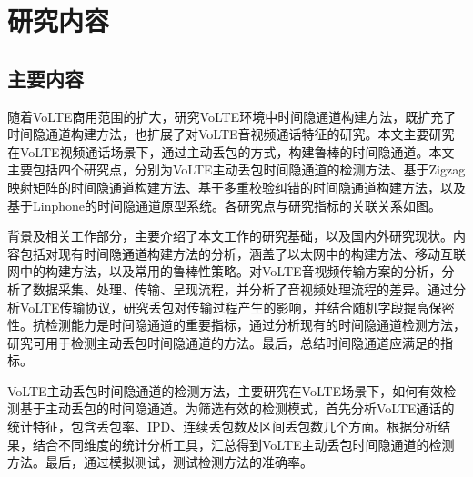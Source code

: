 \section{研究内容}
\label{sec:intro:work}

\subsection{主要内容}
\label{sec:intro:work:mainwork}

随着VoLTE商用范围的扩大，研究VoLTE环境中时间隐通道构建方法，既扩充了时间隐通道构建方法，也扩展了对VoLTE音视频通话特征的研究。本文主要研究在VoLTE视频通话场景下，通过主动丢包的方式，构建鲁棒的时间隐通道。本文主要包括四个研究点，分别为VoLTE主动丢包时间隐通道的检测方法、基于Zigzag映射矩阵的时间隐通道构建方法、基于多重校验纠错的时间隐通道构建方法，以及基于Linphone的时间隐通道原型系统。各研究点与研究指标的关联关系如图。


背景及相关工作部分，主要介绍了本文工作的研究基础，以及国内外研究现状。内容包括对现有时间隐通道构建方法的分析，涵盖了以太网中的构建方法、移动互联网中的构建方法，以及常用的鲁棒性策略。对VoLTE音视频传输方案的分析，分析了数据采集、处理、传输、呈现流程，并分析了音视频处理流程的差异。通过分析VoLTE传输协议，研究丢包对传输过程产生的影响，并结合随机字段提高保密性。抗检测能力是时间隐通道的重要指标，通过分析现有的时间隐通道检测方法，研究可用于检测主动丢包时间隐通道的方法。最后，总结时间隐通道应满足的指标。

VoLTE主动丢包时间隐通道的检测方法，主要研究在VoLTE场景下，如何有效检测基于主动丢包的时间隐通道。为筛选有效的检测模式，首先分析VoLTE通话的统计特征，包含丢包率、IPD、连续丢包数及区间丢包数几个方面。根据分析结果，结合不同维度的统计分析工具，汇总得到VoLTE主动丢包时间隐通道的检测方法。最后，通过模拟测试，测试检测方法的准确率。

